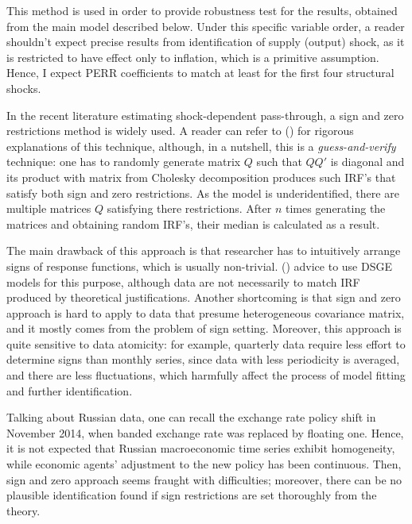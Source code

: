 \documentclass[12pt, a4paper]{extarticle}
\begin{document}
This method is used in order to provide robustness test for the results, obtained from the main model described below. Under this specific variable order, a reader shouldn't expect precise results from identification of supply (output) shock, as it is restricted to have effect only to inflation, which is a primitive assumption. Hence, I expect PERR coefficients to match at least for the first four structural shocks.

In the recent literature estimating shock-dependent pass-through, a sign and zero restrictions method is widely used. A reader can refer to (\cite{Arias2014}) for rigorous explanations of this technique, although, in a nutshell, this is a \textit{guess-and-verify} technique: one has to randomly generate matrix $Q$ such that $QQ'$ is diagonal and its product with matrix from Cholesky decomposition produces such IRF's that satisfy both sign and zero restrictions. As the model is underidentified, there are multiple matrices $Q$ satisfying there restrictions.  After $n$ times generating the matrices and obtaining random IRF's, their median is calculated as a result. 

The main drawback of this approach is that researcher has to intuitively arrange signs of response functions, which is usually non-trivial. (\cite{Ortega2020}) advice to use DSGE models for this purpose, although data are not necessarily to match IRF produced by theoretical justifications. Another shortcoming is that sign and zero approach is hard to apply to data that presume heterogeneous covariance matrix, and it mostly comes from the problem of sign setting. Moreover, this approach is quite sensitive to data atomicity: for example, quarterly data require less effort to determine signs than monthly series, since data with less periodicity is averaged, and there are less fluctuations, which harmfully affect the process of model fitting and further identification. 

Talking about Russian data, one can recall the exchange rate policy shift in November 2014, when banded exchange rate was replaced by floating one. Hence, it is not expected that Russian macroeconomic time series exhibit homogeneity, while economic agents' adjustment to the new policy has been continuous. Then, sign and zero approach seems fraught with difficulties; moreover, there can be no plausible identification found if sign restrictions are set thoroughly from the theory.
\end{document}
